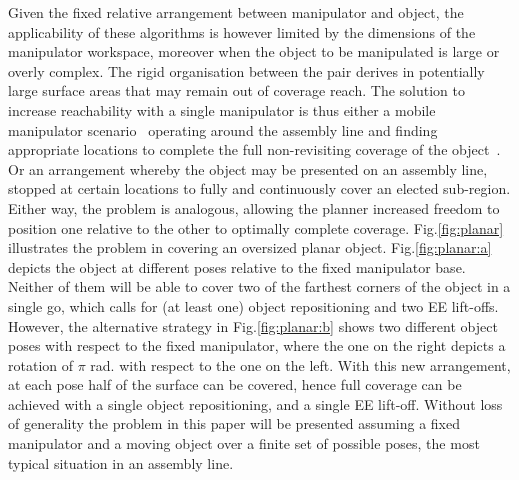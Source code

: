 \documentclass[letterpaper, 10pt, conference]{ieeeconf}
\begin{document}
Given the fixed relative arrangement between manipulator and object, the applicability of these algorithms is however limited by the dimensions of the manipulator workspace, moreover when the object to be manipulated is large or overly complex. The rigid organisation between the pair derives in potentially large surface areas that may remain out of coverage reach. 
The solution to increase reachability with a single manipulator is thus either a mobile manipulator scenario~\cite{Atkar2003Towards} operating around the assembly line and finding appropriate locations to complete the full non-revisiting coverage of the object~\cite{paus2017a}. Or an arrangement whereby the  object may be presented on an assembly line, stopped at certain locations to fully and continuously cover an elected sub-region. Either way, the problem is analogous, allowing the planner increased freedom to position one relative to the other to optimally complete coverage. 
Fig.\ref{fig:planar} illustrates the problem in covering an oversized planar object. Fig.\ref{fig:planar:a} depicts the object at different poses relative to the fixed manipulator base. Neither of them will be able to cover two of the farthest corners of the object in a single go, which calls for (at least one) object repositioning and two EE lift-offs. However, the alternative strategy in Fig.\ref{fig:planar:b} shows two different object poses with respect to the fixed manipulator, where the one on the right depicts a rotation of $\pi$ rad. with respect to the one on the left. With this new arrangement, at each pose half of the surface can be covered, hence full coverage can be achieved with a single object repositioning, and a single EE lift-off. 
Without loss of generality the problem in this paper will be presented assuming a fixed manipulator and a moving object over a finite set of possible poses, the most typical situation in an assembly line. %
\end{document}
